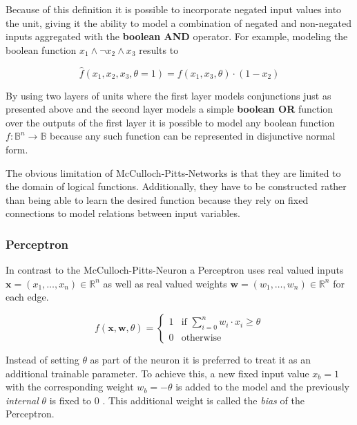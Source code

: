 Because of this definition it is possible to incorporate negated input values into the unit, giving it the ability to model a combination of negated and non-negated inputs aggregated with the \textbf{boolean AND} operator.
For example, modeling the boolean function $x_1 \wedge \neg x_2 \wedge x_3$ results to

\begin{equation}
    \hat{f}(x_1, x_2, x_3, \theta=1) = f(x_1, x_3, \theta) \cdot (1 - x_2)
\end{equation}

By using two layers of units where the first layer models conjunctions just as presented above and the second layer models a simple \textbf{boolean OR} function over the outputs of the first layer it is possible to model any boolean function $f: \mathbb{B}^n \to \mathbb{B}$ because any such function can be represented in disjunctive normal form.

The obvious limitation of McCulloch-Pitts-Networks is that they are limited to the domain of logical functions.
Additionally, they have to be constructed rather than being able to learn the desired function because they rely on fixed connections to model relations between input variables.

\subsubsection{Perceptron}

In contrast to the McCulloch-Pitts-Neuron a Perceptron uses real valued inputs $\bm{x} = (x_1, \dots, x_n) \in \mathbb{R}^n$ as well as real valued weights $\bm{w} = (w_1, \dots, w_n) \in \mathbb{R}^n$ for each edge.

\begin{equation}
    f(\bm{x}, \bm{w}, \theta) =
    \begin{cases}
        1 & \text{if } \sum_{i=0}^n w_i \cdot x_i \geq \theta \\
        0 & \text{otherwise}
    \end{cases}
\end{equation}

Instead of setting $\theta$ as part of the neuron it is preferred to treat it as an additional trainable parameter.
To achieve this, a new fixed input value $x_b = 1$ with the corresponding weight $w_b = -\theta$ is added to the model and the previously \emph{internal} $\theta$ is fixed to $0$ .
This additional weight is called the \textit{bias} of the Perceptron.

